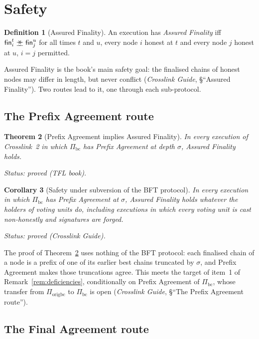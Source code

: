 \documentclass[11pt,a4paper]{article}
\newtheorem{theorem}{Theorem}[section]
\newtheorem{corollary}[theorem]{Corollary}
\theoremstyle{definition}
\newtheorem{definition}[theorem]{Definition}
\newcommand{\bc}{\mathrm{bc}}
\newcommand{\agrees}{\mathrel{\preceq\mkern-9mu\succeq}}
\newcommand{\Piorigbc}{\Pi_{\mathrm{origbc}}}
\newcommand{\Pibc}{\Pi_{\bc}}
\newcommand{\fin}{\mathsf{fin}}
\begin{document}
\section{Safety}\label{sec:safety}

\begin{definition}[Assured Finality]\label{def:af}
An execution has \emph{Assured Finality} iff $\fin_i^t \agrees \fin_j^u$ for
all times $t$ and $u$, every node $i$ honest at $t$ and every node $j$
honest at $u$, $i = j$ permitted.
\end{definition}

Assured Finality is the book's main safety goal: the finalised chains of
honest nodes may differ in length, but never conflict (\emph{Crosslink
Guide}, \S``Assured Finality''). Two routes lead to it, one through each
sub-protocol.

\subsection{The Prefix Agreement route}\label{sec:safety-pa}

\begin{theorem}[Prefix Agreement implies Assured Finality]\label{thm:pa-af}
In every execution of Crosslink~2 in which $\Pibc$ has Prefix Agreement at
depth $\sigma$, Assured Finality holds.

Status: proved (TFL book).
\end{theorem}

\begin{corollary}[Safety under subversion of the BFT protocol]
\label{cor:bft-subversion}
In every execution in which $\Pibc$ has Prefix Agreement at $\sigma$,
Assured Finality holds whatever the holders of voting units do, including
executions in which every voting unit is cast non-honestly and signatures
are forged.

Status: proved (Crosslink Guide).
\end{corollary}

The proof of Theorem~\ref{thm:pa-af} uses nothing of the BFT protocol: each
finalised chain of a node is a prefix of one of its earlier best chains
truncated by $\sigma$, and Prefix Agreement makes those truncations agree.
This meets the target of item~1 of Remark~\ref{rem:deficiencies},
conditionally on Prefix Agreement of $\Pibc$, whose transfer from
$\Piorigbc$ to $\Pibc$ is open (\emph{Crosslink Guide}, \S``The Prefix
Agreement route'').

\subsection{The Final Agreement route}\label{sec:safety-fa}
\end{document}
